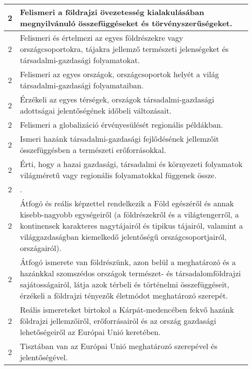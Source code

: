 \begin{longtable}{c | p{12cm} }
                                
                                          2 &  Felismeri a földrajzi övezetesség kialakulásában megnyilvánuló összefüggéseket és törvényszerűségeket. \\ \hline
                                          2 &  Felismeri és értelmezi az egyes földrészekre vagy országcsoportokra, tájakra jellemző természeti jelenségeket és  társadalmi-gazdasági folyamatokat. \\ \hline
                                          2 &  Felismeri az egyes országok, országcsoportok helyét a világ társadalmi-gazdasági folyamataiban. \\ \hline
                                          2 &  Érzékeli az egyes térségek, országok társadalmi-gazdasági adottságai jelentőségének időbeli változásait. \\ \hline
                                          2 &  Felismeri a globalizáció érvényesülését regionális példákban. \\ \hline
                                          2 &  Ismeri hazánk társadalmi-gazdasági fejlődésének jellemzőit összefüggésben a természeti erőforrásokkal. \\ \hline
                                          2 &  Érti, hogy a hazai gazdasági, társadalmi és környezeti folyamatok világméretű vagy regionális folyamatokkal függenek össze. \\ \hline
                                          2 &  . \\ \hline
                                          2 &  Átfogó és reális képzettel rendelkezik a Föld egészéről és annak kisebb-nagyobb egységeiről (a földrészekről és a világtengerről, a kontinensek karakteres nagytájairól és tipikus tájairól, valamint a világgazdaságban kiemelkedő jelentőségű országcsoportjairól, országairól). \\ \hline
                                          2 &  Átfogó ismerete van földrészünk, azon belül a meghatározó és a hazánkkal szomszédos országok természet- és társadalomföldrajzi sajátosságairól, látja azok térbeli és történelmi összefüggéseit, érzékeli a földrajzi tényezők életmódot meghatározó szerepét. \\ \hline
                                          2 &  Reális ismereteket birtokol a Kárpát-medencében fekvő hazánk földrajzi jellemzőiről, erőforrásairól és az ország gazdasági lehetőségeiről az Európai Unió keretében. \\ \hline
                                          2 &  Tisztában van az Európai Unió meghatározó szerepével és jelentőségével. \\ \hline

\end{longtable}
